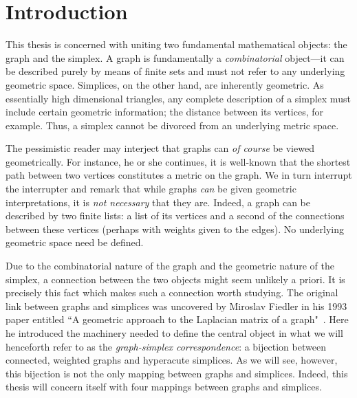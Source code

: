 \chapter{Introduction}
\label{chap:intro}



This thesis is concerned with uniting two fundamental mathematical objects: the graph and the simplex. A graph is fundamentally a  \emph{combinatorial} object---it can be described purely by means of finite sets and must not refer to any underlying geometric space.  
Simplices, on  the other hand, are inherently  geometric. As essentially high dimensional triangles, any complete description of a simplex must include certain geometric information; the distance between its vertices, for example. Thus, a simplex cannot be divorced from an  underlying metric space. 

The pessimistic reader may interject that graphs can \emph{of course} be viewed geometrically. For instance, he or she continues, it  is well-known that the shortest path between two vertices constitutes  a metric on  the graph. We in turn interrupt the interrupter and remark that while graphs \emph{can} be  given  geometric interpretations, it is \emph{not necessary} that  they are. Indeed, a graph can  be described by two finite lists: a list of its vertices and a second of the connections between these vertices (perhaps with  weights  given  to the  edges). No underlying geometric space need be defined. 

Due  to the combinatorial  nature of the graph and the geometric nature of the simplex, a connection between the two objects might seem unlikely a  priori. It is precisely this fact which makes such a connection worth studying. 
The original  link  between graphs and simplices was uncovered by 
Miroslav Fiedler  in his 1993 paper entitled ``A geometric approach to the Laplacian matrix of a graph"~\cite{fiedler1993geometric}. Here he introduced the machinery needed to define the central  object in what we will henceforth refer to as the \emph{graph-simplex correspondence}: a bijection between connected, weighted graphs and hyperacute simplices. As we will see,  however, this bijection is not the only mapping between graphs and simplices. Indeed,  this  thesis will concern itself with four mappings  between graphs and simplices. 

